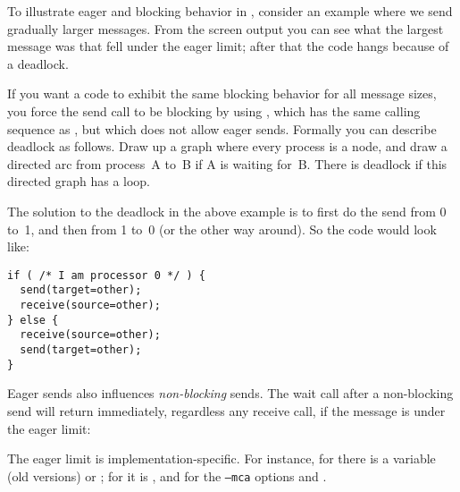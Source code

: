 \begin{comment}
  The following code is guaranteed to block, since a \indexmpishow{MPI_Recv}
  always blocks:
  \cverbatimsnippet[examples/mpi/c/recvblock.c]{recvblock}
  On the other hand, if we put the send call before the receive,
  code may not block for small messages
  that fall under the eager limit.
\end{comment}

To illustrate eager and blocking behavior in ,
consider an example where we send
gradually larger messages. From the screen output you can see what
the largest message was that fell under the eager limit; after that the code
hangs because of a deadlock.
%
%
%

If you want a code to exhibit the same blocking behavior for  all message sizes,
you force the send call to be blocking by using
, which has the same calling sequence as ,
but which does not allow eager sends.
%
%
Formally you can describe deadlock as follows. Draw up a graph where
every process is a node, and draw a directed arc from process~A to~B if
A is waiting for~B. There is deadlock if this directed graph has a
loop.

The solution to the deadlock in the above example is to first do the
send from 0 to~1, and then from 1 to~0 (or the other way around). So
the code would look like:
\begin{lstlisting}
if ( /* I am processor 0 */ ) {
  send(target=other);
  receive(source=other);
} else {
  receive(source=other);
  send(target=other);
}
\end{lstlisting}

Eager sends also influences
\emph{non-blocking} sends.
The wait call after a non-blocking send
will return immediately, regardless any receive call,
if the message is under the eager limit:
%
%

The eager limit is implementation-specific.
For instance,
for  there is a variable
 (old versions) or ;
for  it is ,
and for  the
\texttt{--mca} options  and
.

